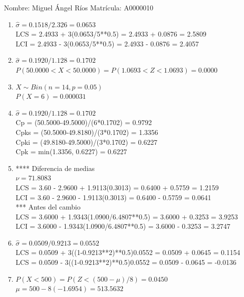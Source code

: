 \documentclass[8pt]{report}
\begin{document}
 \newpage

Nombre: \underline{\hspace*{.2in}}
Miguel Ángel Ríos
\underline{\hspace*{.2in}} \quad Matr\'icula:\underline{\hspace*{.2in}}
A0000010
\underline{\hspace*{.2in}} \\

\begin{enumerate}
\item $\hat\sigma = 0.1518/2.326 = 0.0653$\\
LCS = 2.4933 + 3(0.0653/5**0.5) = 2.4933 + 0.0876 = 2.5809\\
LCI = 2.4933 - 3(0.0653/5**0.5) = 2.4933 - 0.0876 = 2.4057
\item $\hat\sigma = 0.1920/1.128 = 0.1702$\\
$P(50.0000 < X < 50.0000) = P(1.0693 < Z < 1.0693) = 0.0000$\\
\item $X \sim Bin(n=14, p=0.05)$\\
$P(X = 6) = 0.000031$
\item $\hat\sigma = 0.1920/1.128 = 0.1702$\\
Cp = (50.5000-49.5000)/(6*0.1702) = 0.9792\\
Cpks = (50.5000-49.8180)/(3*0.1702) = 1.3356\\
Cpki = (49.8180-49.5000)/(3*0.1702) = 0.6227\\
Cpk = min(1.3356, 0.6227) = 0.6227
\item **** Diferencia de medias\\
$\nu = 71.8083$\\
LCS = 3.60 - 2.9600 + 1.9113(0.3013) = 0.6400 + 0.5759 = 1.2159\\
LCI = 3.60 - 2.9600 - 1.9113(0.3013) = 0.6400 - 0.5759 = 0.0641\\
*** Antes del cambio\\
LCS = 3.6000 + 1.9343(1.0900/6.4807**0.5) = 3.6000 + 0.3253 = 3.9253\\
LCI = 3.6000 - 1.9343(1.0900/6.4807**0.5) = 3.6000 - 0.3253 = 3.2747\\
\item $\hat\sigma = 0.0509/0.9213 = 0.0552$\\
LCS = 0.0509 + 3((1-0.9213**2)**0.5)0.0552 = 0.0509 + 0.0645 = 0.1154\\
LCS = 0.0509 - 3((1-0.9213**2)**0.5)0.0552 = 0.0509 - 0.0645 = -0.0136
\item $P(X < 500) = P(Z < (500-\mu)/8) = 0.0450$\\
$\mu = 500 - 8(-1.6954) = 513.5632$\\
\end{enumerate}
\end{document}
